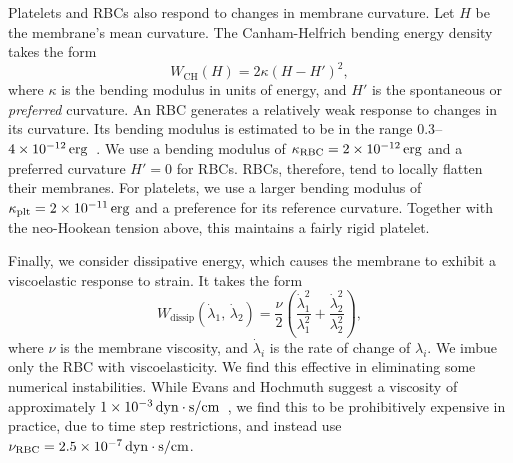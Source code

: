 Platelets and RBCs also respond to changes in membrane curvature. Let $H$ be the
membrane's mean curvature. The Canham-Helfrich bending energy density takes the form~%
\cite{Canham:1970wx}
\begin{equation}\label{eq:bending-energy}
    W_\text{CH}(H) = 2\kappa (H-H')^2,
\end{equation}
where $\kappa$ is the bending modulus in units of energy, and $H'$ is the spontaneous or
\emph{preferred} curvature. An RBC generates a relatively weak response to changes in its
curvature. Its bending modulus is estimated to be in the range $0.3$--%
$\scinot{4}{-12}\erg$~\cite{Mohandas:1994tg}. We use a bending modulus of
$\rbc\kappa = \scinot{2}{-12}\erg$ and a preferred curvature $H' = 0$ for RBCs. RBCs,
therefore, tend to locally flatten their membranes. For platelets, we use a larger
bending modulus of $\plt\kappa = \scinot{2}{-11}\erg$ and a preference for its reference
curvature. Together with the neo-Hookean tension above, this maintains a fairly rigid
platelet.

Finally, we consider dissipative energy, which causes the membrane to exhibit a
viscoelastic response to strain. It takes the form~\cite{Rangamani:2012hi}
\begin{equation}\label{eq:dissip-energy}
    W_\text{dissip}(\dot{\lambda}_1,\,\dot{\lambda}_2) = \frac{\nu}{2}\left(\frac{\dot{\lambda}_1^2}{\lambda_1^2} + \frac{\dot{\lambda}_2^2}{\lambda_2^2}\right),
\end{equation}
where $\nu$ is the membrane viscosity, and $\dot{\lambda}_i$ is the rate of change of
$\lambda_i$. We imbue only the RBC with viscoelasticity. We find this effective in
eliminating some numerical instabilities. While Evans and Hochmuth suggest a viscosity of
approximately $\scinot{1}{-3}\dynsecpercm$~\cite{Evans:1976tx}, we find this to be
prohibitively expensive in practice, due to time step restrictions, and instead use
$\rbc\nu = \scinot{2.5}{-7}\dynsecpercm$.

